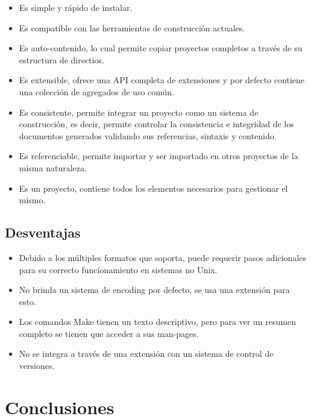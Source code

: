 \documentclass{sig-alternate}
\begin{document}
	\begin{itemize}
		\item Es simple y r\'apido de instalar.
		\item Es compatible con las herramientas de construcci\'on actuales.
		\item Es auto-contenido, lo cual permite copiar proyectos completos 
		  a trav\'es de su estructura de directios.
		\item Es extensible, ofrece una API completa de extensiones y 
		  por defecto contiene una colecci\'on de agregados de uso com\'un.
		\item Es consistente, permite integrar un proyecto como un sistema de 
		  construcci\'on, es decir, permite controlar la consistencia e integridad
		  de los documentos generados validando sus referencias, sintaxis y 
		  contenido. 		
		\item Es referenciable, permite importar y ser importado en otros 
		  proyectos de la misma naturaleza.
		\item Es un proyecto, contiene todos los elementos necesarios para 
		  gestionar el mismo.
	\end{itemize}
	
	\subsection{Desventajas}
	
	\begin{itemize}

		\item Debido a los m\'ultiples formatos que soporta, puede requerir 
		  pasos adicionales para su correcto funcionamiento en sistemas 
		  no Unix.
		\item No brinda un sistema de encoding por defecto, se usa una extensi\'on
		  para esto.
		\item Los comandos Make tienen un texto descriptivo, pero para ver 
		  un resumen completo se tienen que acceder a sus man-pages.
		\item No se integra a trav\'es de una extensi\'on con un sistema de control 
		de versiones.
	\end{itemize}

\section{Conclusiones}
\end{document}
